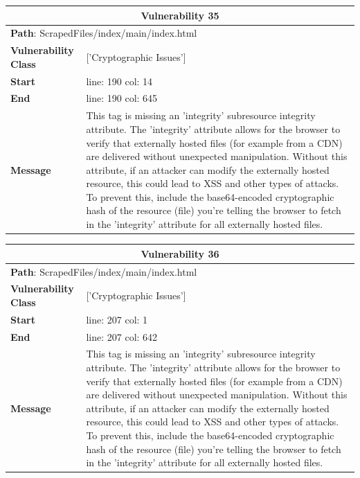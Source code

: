 \documentclass[12pt]{article}
\begin{document}
\vspace{0.7cm}
\FloatBarrier
\begin{table}[!h]
\centering
\renewcommand{\arraystretch}{1.3}
\begin{tabular}{|l|p{10cm}|}
\hline
\multicolumn{2}{|c|}{\textbf{Vulnerability 35}} \\
\hline
\multicolumn{2}{|l|}{\textbf{Path}: ScrapedFiles/index/main/index.html} \\
\hline
\textbf{Vulnerability Class} & ['Cryptographic Issues'] \\
\hline
\textbf{Start} & line: 190 \quad col: 14 \\
\hline
\textbf{End} & line: 190 \quad col: 645 \\
\hline
\textbf{Message} & This tag is missing an 'integrity' subresource integrity attribute. The 'integrity' attribute allows for the browser to verify that externally hosted files (for example from a CDN) are delivered without unexpected manipulation. Without this attribute, if an attacker can modify the externally hosted resource, this could lead to XSS and other types of attacks. To prevent this, include the base64-encoded cryptographic hash of the resource (file) you're telling the browser to fetch in the 'integrity' attribute for all externally hosted files. \\
\hline
\end{tabular}
\end{table}
\vspace{0.7cm}
\FloatBarrier
\begin{table}[!h]
\centering
\renewcommand{\arraystretch}{1.3}
\begin{tabular}{|l|p{10cm}|}
\hline
\multicolumn{2}{|c|}{\textbf{Vulnerability 36}} \\
\hline
\multicolumn{2}{|l|}{\textbf{Path}: ScrapedFiles/index/main/index.html} \\
\hline
\textbf{Vulnerability Class} & ['Cryptographic Issues'] \\
\hline
\textbf{Start} & line: 207 \quad col: 1 \\
\hline
\textbf{End} & line: 207 \quad col: 642 \\
\hline
\textbf{Message} & This tag is missing an 'integrity' subresource integrity attribute. The 'integrity' attribute allows for the browser to verify that externally hosted files (for example from a CDN) are delivered without unexpected manipulation. Without this attribute, if an attacker can modify the externally hosted resource, this could lead to XSS and other types of attacks. To prevent this, include the base64-encoded cryptographic hash of the resource (file) you're telling the browser to fetch in the 'integrity' attribute for all externally hosted files. \\
\hline
\end{tabular}
\end{table}
\end{document}
